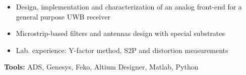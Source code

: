 \documentclass[10pt,a4paper]{altacv}
\begin{document}

\divider

\medskip
\begin{itemize}
    \item Design, implementation and characterization of an analog front-end for a general purpose UWB receiver
    \item Microstrip-based filters and antennas design with special substrates
    \item Lab. experience: Y-factor method, S2P and distortion measurements
\end{itemize}
\medskip
\small{
\textbf{Tools:} ADS, Genesys, Feko, Altium Designer, Matlab, Python}

\end{document}
